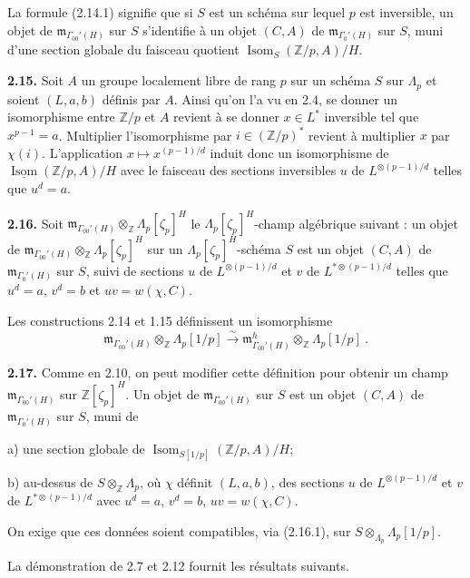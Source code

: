 \documentclass[10pt,a4paper]{amsart}
\theoremstyle{plain}
\theoremstyle{definition}
\DeclareMathOperator{\Isom}{Isom}
\newcommand{\m}{\mathfrak{m}}
\newcommand{\ZZ}{\mathbb{Z}}
\begin{document}
La formule (2.14.1) signifie que si $S$ est un sch\'ema sur lequel $p$ est inversible, un objet de $\m_{\Gamma_{00}'(H)}$ sur $S$ s'identifie \`a un objet $(C,A)$ de $\m_{\Gamma_0'(H)}$ sur $S$, muni d'une section globale du faisceau quotient $\Isom_S(\ZZ/p, A)/H$.

\medskip\noindent\textbf{2.15.} Soit $A$ un groupe localement libre de rang $p$ sur un sch\'ema $S$ sur $\Lambda_p$ et soient $(L,a,b)$ d\'efinis par $A$. Ainsi qu'on l'a vu en 2.4, se donner un isomorphisme entre $\ZZ/p$ et $A$ revient \`a se donner $x \in L^*$ inversible tel que $x^{p-1} = a$. Multiplier l'isomorphisme par $i \in (\ZZ/p)^*$ revient \`a multiplier $x$ par $\chi(i)$. L'application $x \mapsto x^{(p-1)/d}$ induit donc un isomorphisme de $\underline{\Isom}(\ZZ/p, A)/H$ avec le faisceau des sections inversibles $u$ de $L^{\otimes(p-1)/d}$ telles que $u^d = a$.

\medskip\noindent\textbf{2.16.} Soit $\m_{\Gamma_{00}'(H)} \otimes_\ZZ \Lambda_p[\zeta_p]^H$ le $\Lambda_p[\zeta_p]^H$-champ alg\'ebrique suivant : un objet de $\m_{\Gamma_{00}'(H)} \otimes_\ZZ \Lambda_p[\zeta_p]^H$ sur un $\Lambda_p[\zeta_p]^H$-sch\'ema $S$ est un objet $(C,A)$ de $\m_{\Gamma_0'(H)}$ sur $S$, suivi de sections $u$ de $L^{\otimes(p-1)/d}$ et $v$ de $L^{*\otimes(p-1)/d}$ telles que $u^d = a$, $v^d = b$ et $uv = w(\chi,C)$.

Les constructions 2.14 et 1.15 d\'efinissent un isomorphisme
\begin{equation}
\m_{\Gamma_{00}'(H)} \otimes_\ZZ \Lambda_p[1/p] \xrightarrow{\;\sim\;} \m_{\Gamma_{00}'(H)}^h \otimes_\ZZ \Lambda_p[1/p]\ .
\end{equation}

\medskip\noindent\textbf{2.17.} Comme en 2.10, on peut modifier cette d\'efinition pour obtenir un champ $\m_{\Gamma_{00}'(H)}$ sur $\ZZ[\zeta_p]^H$. Un objet de $\m_{\Gamma_{00}'(H)}$ sur $S$ est un objet $(C,A)$ de $\m_{\Gamma_0'(H)}$ sur $S$, muni de

a) une section globale de $\Isom_{S[1/p]}(\ZZ/p, A)/H$;

b) au-dessus de $S \otimes_{\ZZ} \Lambda_p$, o\`u $\chi$ d\'efinit $(L,a,b)$, des sections $u$ de $L^{\otimes(p-1)/d}$ et $v$ de $L^{*\otimes(p-1)/d}$ avec $u^d = a$, $v^d = b$, $uv = w(\chi,C)$.

On exige que ces donn\'ees soient compatibles, via (2.16.1), sur $S \otimes_{\Lambda_p} \Lambda_p[1/p]$.

La d\'emonstration de 2.7 et 2.12 fournit les r\'esultats suivants.
\end{document}
